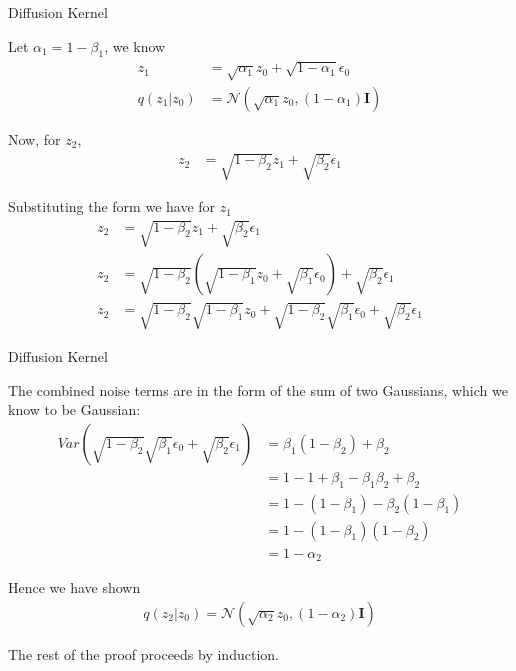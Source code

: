 \documentclass[aspectratio=169,xcolor=dvipsnames]{beamer}
\theoremstyle{named}
\begin{document}
\begin{frame}{Diffusion Kernel}

Let $\alpha_1 = 1 - \beta_1$, we know
\begin{align*}
    z_1 &= \sqrt{\alpha_1} z_0 + \sqrt{1 - \alpha_1}\epsilon_0 \\
    q(z_1 | z_0) &= \mathcal{N}(\sqrt{\alpha_1} z_0, (1-\alpha_1)\mathbf{I})
\end{align*}

Now, for $z_2$,
\begin{align*}
    z_2 &= \sqrt{1-\beta_2} z_1 + \sqrt{\beta_2}\epsilon_1
\end{align*}

Substituting the form we have for $z_1$
\begin{align*}
    z_2 &= \sqrt{1-\beta_2} z_1 + \sqrt{\beta_2}\epsilon_1 \\
    z_2 &= \sqrt{1-\beta_2} (\sqrt{1-\beta_1} z_0 + \sqrt{\beta_1}\epsilon_0) + \sqrt{\beta_2}\epsilon_1 \\
    z_2 &= \sqrt{1-\beta_2}\sqrt{1-\beta_1} z_0 + \sqrt{1-\beta_2}\sqrt{\beta_1}\epsilon_0 + \sqrt{\beta_2}\epsilon_1
\end{align*}

\end{frame}


\begin{frame}{Diffusion Kernel}

The combined noise terms are in the form of the sum of two Gaussians, which we know to be Gaussian:
\begin{align*}
     Var(\sqrt{1-\beta_2}\sqrt{\beta_1}\epsilon_0 + \sqrt{\beta_2}\epsilon_1) &= \beta_1(1-\beta_2)+\beta_2 \\
     &= 1 - 1 + \beta_1 - \beta_1 \beta_2 + \beta_2 \\
     &= 1 - (1 - \beta_1) - \beta_2 (1 - \beta_1) \\
     &= 1 - (1 - \beta_1)(1-\beta_2) \\
     &= 1 - \alpha_2
\end{align*}

Hence we have shown
\begin{align*}
     q(z_2 | z_0) = \mathcal{N}(\sqrt{\alpha_2} z_0, (1 - \alpha_2) \mathbf{I})
\end{align*}

The rest of the proof proceeds by induction.

\end{frame}
\end{document}
